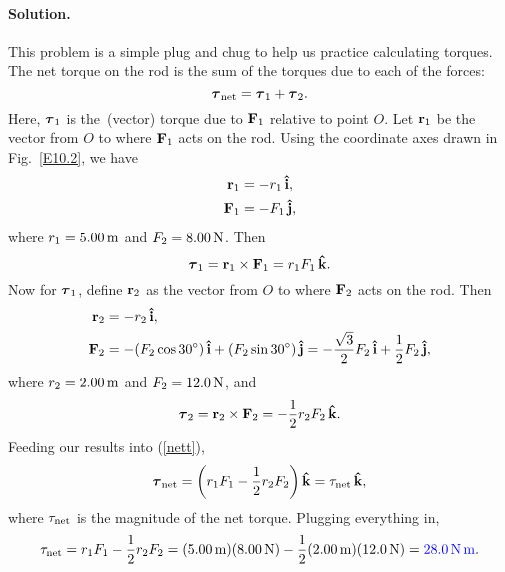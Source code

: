 \documentclass[11pt]{article}
\newcommand{\refeq}[1]{(\ref{#1})}
\newcommand{\beq}{\begin{equation*}}
\newcommand{\eeq}{\end{equation*}}
\newcommand{\beqn}{\begin{equation}}
\newcommand{\eeqn}{\end{equation}}
\newenvironment{solution}
{
    \paragraph{Solution.}
    \ignorespaces
}
{
    \bigskip
}
\begin{document}
\begin{solution}
	This problem is a simple plug and chug to help us practice calculating torques.  The net torque on the rod is the sum of the torques due to each of the forces:
	\beqn \label{nett}
		\vtnet = \vtq + \vtw.
	\eeqn
	Here, $\boldsymbol{\tau}_1$ is the~(vector) torque due to $\mathbf{F}_1$ relative to point $O$.  Let $\mathbf{r}_1$ be the vector from $O$ to where $\mathbf{F}_1$ acts on the rod.  Using the coordinate axes drawn in Fig.~\ref{E10.2}, we have
	\begin{align*}
		\mathbf{r}_1 &= -r_1 \mathbf{\,\hat{i}}, \\
		\mathbf{F}_1 &= -F_1 \mathbf{\,\hat{j}},
	\end{align*}
	where $r_1 = \SI{5.00}{\meter}$ and $F_2 = \SI{8.00}{\newton}$.  Then
	\beq
		\vtq = \vrq \times \vFq = \rrq \Fq \kh.
	\eeq
	Now for $\boldsymbol{\tau}_1$, define $\mathbf{r}_2$ as the vector from $O$ to where $\mathbf{F}_2$ acts on the rod.  Then
		\begin{align*}
		\mathbf{r}_2 &= -r_2 \mathbf{\,\hat{i}}, \\
		\mathbf{F}_2 &= -(F_2 \cos{30^\circ}) \mathbf{\,\hat{i}} + (F_2 \sin{30^\circ}) \mathbf{\,\hat{j}} = -\frac{\sqrt{3}}{2} F_2 \mathbf{\,\hat{i}} + \frac{1}{2} F_2 \mathbf{\,\hat{j}},
	\end{align*}
	where $r_2 = \SI{2.00}{\meter}$ and $F_2 = \SI{12.0}{\newton}$, and
	\beq
		\vtw = \vrw \times \vFw = -\frac{1}{2} \rw \Fw \kh.
	\eeq
	Feeding our results into \refeq{nett},
	\beq
		\vtnet = \left( \rrq \Fq - \frac{1}{2} \rw \Fw \right)\!\kh = \tnet \kh,
	\eeq
	where $\tau_\text{net}$ is the magnitude of the net torque.  Plugging everything in,
	\beq
		\tnet = \rrq \Fq - \frac{1}{2} \rw \Fw = (\SI{5.00}{\meter}) (\SI{8.00}{\newton}) - \frac{1}{2} (\SI{2.00}{\meter}) (\SI{12.0}{\newton}) = {\color{blue} \SI{28.0}{\newton\meter}}.
	\eeq
\end{solution}

\newcommand{\mb}{m_b}
\newcommand{\mw}{m_w}
\newcommand{\mmp}{m_p}

\newcommand{\simb}{\SI{12.0}{\kg} }
\newcommand{\simw}{\SI{5.00}{\kg} }
\newcommand{\simp}{\SI{2.00}{\kg} }
\newcommand{\sIip}{\SI{0.0625}{\kg\square\meter} }

\newcommand{\sig}{\SI{9.81}{\meter\per\square\second} }

\newcommand{\Ww}{W_w}
\newcommand{\aq}{a_b}

\newcommand{\Tb}{T_b}
\newcommand{\Tw}{T_w}

\newcommand{\az}{\alpha_z}

\newcommand{\Nx}{N_x}
\newcommand{\Ny}{N_y}

\clearpage
\end{document}

